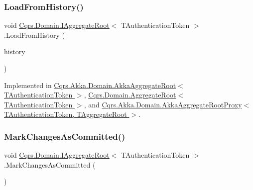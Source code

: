 \mbox{\label{interfaceCqrs_1_1Domain_1_1IAggregateRoot_afe9329ee26ae68613059189ca64dfe60_afe9329ee26ae68613059189ca64dfe60}} 
\subsubsection{\texorpdfstring{Load\+From\+History()}{LoadFromHistory()}}
{\footnotesize\ttfamily void \hyperlink{interfaceCqrs_1_1Domain_1_1IAggregateRoot}{Cqrs.\+Domain.\+I\+Aggregate\+Root}$<$ T\+Authentication\+Token $>$.Load\+From\+History (\begin{DoxyParamCaption}\item[{I\+Enumerable$<$ \hyperlink{interfaceCqrs_1_1Events_1_1IEvent}{I\+Event}$<$ T\+Authentication\+Token $>$$>$}]{history }\end{DoxyParamCaption})}



Implemented in \hyperlink{classCqrs_1_1Akka_1_1Domain_1_1AkkaAggregateRoot_af6d84b07d4e9475bb88e769ac9081830_af6d84b07d4e9475bb88e769ac9081830}{Cqrs.\+Akka.\+Domain.\+Akka\+Aggregate\+Root$<$ T\+Authentication\+Token $>$}, \hyperlink{classCqrs_1_1Domain_1_1AggregateRoot_aec873ad6e4c98309cad2d9f1c534aebb_aec873ad6e4c98309cad2d9f1c534aebb}{Cqrs.\+Domain.\+Aggregate\+Root$<$ T\+Authentication\+Token $>$}, and \hyperlink{classCqrs_1_1Akka_1_1Domain_1_1AkkaAggregateRootProxy_ae611077a51a215aef7fd0e106734b386_ae611077a51a215aef7fd0e106734b386}{Cqrs.\+Akka.\+Domain.\+Akka\+Aggregate\+Root\+Proxy$<$ T\+Authentication\+Token, T\+Aggregate\+Root $>$}.

\mbox{\label{interfaceCqrs_1_1Domain_1_1IAggregateRoot_af31116870bbf6566b3eec0b8bc02c6de_af31116870bbf6566b3eec0b8bc02c6de}} 
\subsubsection{\texorpdfstring{Mark\+Changes\+As\+Committed()}{MarkChangesAsCommitted()}}
{\footnotesize\ttfamily void \hyperlink{interfaceCqrs_1_1Domain_1_1IAggregateRoot}{Cqrs.\+Domain.\+I\+Aggregate\+Root}$<$ T\+Authentication\+Token $>$.Mark\+Changes\+As\+Committed (\begin{DoxyParamCaption}{ }\end{DoxyParamCaption})}



